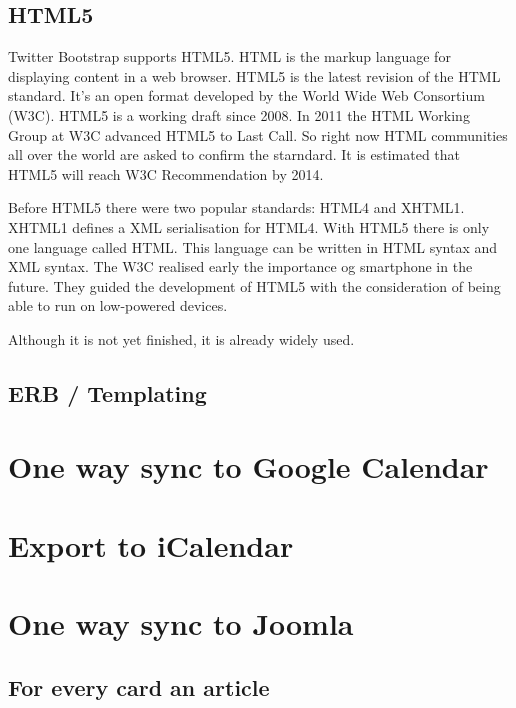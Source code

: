 \subsection{HTML5}
Twitter Bootstrap supports HTML5. HTML is the markup language for displaying content in a web browser. HTML5 is the latest revision of the HTML standard. It's an open format developed by the World Wide Web Consortium (W3C). HTML5 is a working draft since 2008. In 2011 the HTML Working Group at W3C advanced HTML5 to Last Call. So right now HTML communities all over the world are asked to confirm the starndard.  It is estimated that HTML5 will reach W3C Recommendation by 2014.\cite{html:lastcall}

Before HTML5  there were two popular standards: HTML4 and XHTML1. XHTML1 defines a XML serialisation for HTML4. With HTML5 there is only one language called HTML. This language can be written in HTML syntax and XML syntax. 
\cite{html:5differences} The W3C realised early the importance og smartphone in the future. They guided the development of HTML5 with the consideration of being able to run on low-powered devices. 

 Although it is not yet finished, it is already widely used.

\subsection{ERB / Templating}

\section{One way sync to Google Calendar}

\section{Export to iCalendar}

\section{One way sync to Joomla}

\subsection{For every card an article}


